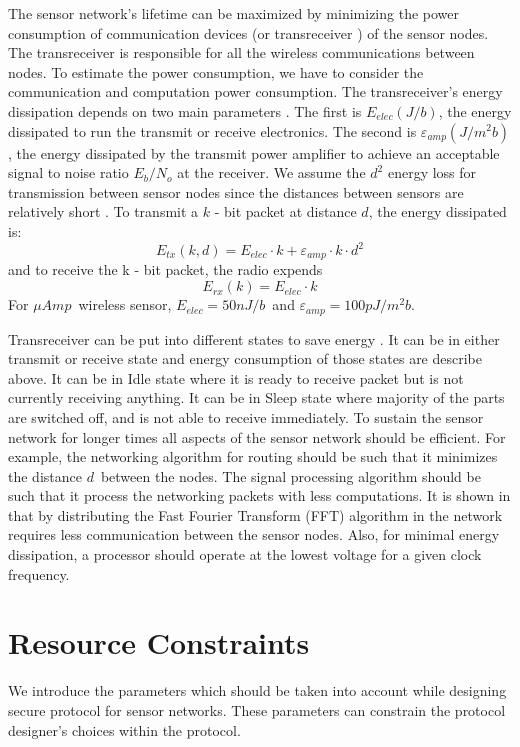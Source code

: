 	The sensor network's lifetime can be maximized by minimizing the power consumption of communication devices (or transreceiver ) of the sensor nodes.
	The transreceiver is responsible for all the wireless communications between nodes.
	To estimate the power consumption, we have to consider the communication and computation power consumption.
	The transreceiver's energy dissipation depends on two main parameters \cite{wang2002energy}.
	The first is $E_{elec} (J/b)$, the energy dissipated to run the transmit or receive electronics.
	The second is $\varepsilon_{amp} (J/m^2 b)$, the energy dissipated by the transmit power amplifier to achieve an acceptable signal to noise ratio $E_{b} / N_{o} $ at the receiver.
	We assume the $d^2$ energy loss for transmission between sensor nodes since the distances between sensors are relatively short \cite{ettus1998system}. 
	To transmit a $k$ - bit packet at distance $d$, the energy dissipated is:
	\begin{equation}
		E_{tx}(k, d) = E_{elec} \cdot k + \varepsilon_{amp} \cdot k \cdot d^{2}
	\end{equation}
	and to receive the k - bit packet, the radio expends
	\begin{equation}
		E_{rx}(k) = E_{elec} \cdot k
	\end{equation}
	For $\mu Amp$\ wireless sensor, $E_{elec} = 50nJ/b$\ and $\varepsilon_{amp} = 100pJ/m^2 b$.

	Transreceiver can be put into different states to save energy \cite{karl2007protocols}.
	It can be in either transmit or receive state and energy consumption of those states are describe above.
	It can be in Idle state where it is ready to receive packet but is not currently receiving anything.
	It can be in Sleep state where majority of the parts are switched off, and is not able to receive immediately. 
 	To sustain the sensor network for longer times all aspects of the sensor network should be efficient.
	For example, the networking algorithm for routing should be such that it minimizes the distance $d$\ between the nodes.
	The signal processing algorithm should be such that it process the networking packets with less computations.
	It is shown in \cite{wang2002energy} that by distributing the Fast Fourier Transform (FFT) algorithm in the network requires less communication between the sensor nodes.
	Also, for minimal energy dissipation, a processor should operate at the lowest voltage for a given clock frequency.

\section{Resource Constraints}
	\label{sec:aggregate-adversary}
	We introduce the parameters which should be taken into account while designing secure protocol for sensor networks.  
	These parameters can constrain the protocol designer's choices within the protocol.

